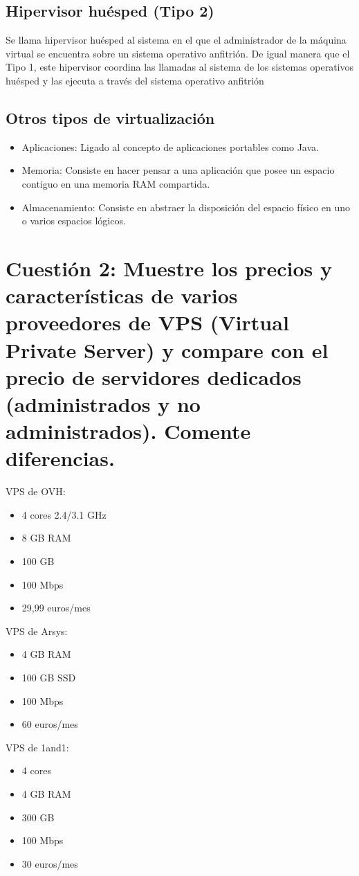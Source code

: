 \subsection{Hipervisor huésped (Tipo 2)}
Se llama hipervisor huésped al sistema en el que el administrador de la máquina virtual se encuentra sobre un sistema operativo anfitrión. De igual manera que el Tipo 1, este hipervisor coordina las llamadas al sistema de los sistemas operativos huésped y las ejecuta a través del sistema operativo anfitrión \cite{hh}

\subsection{Otros tipos de virtualización}
\begin{itemize}
\item Aplicaciones:
Ligado al concepto de aplicaciones portables como Java.
\item Memoria:
Consiste en hacer pensar a una aplicación que posee un espacio contiguo en una memoria RAM compartida.
\item Almacenamiento:
Consiste en abstraer la disposición del espacio físico en uno o varios espacios lógicos.
\end{itemize}


\section{Cuestión 2: Muestre los precios y características de varios proveedores de VPS (Virtual Private Server) y compare con el precio de servidores dedicados (administrados y no administrados). Comente diferencias.}
VPS de OVH: \cite{3}
\begin{itemize}
\item 4 cores 2.4/3.1 GHz
\item 8 GB RAM
\item 100 GB
\item 100 Mbps
\item 29,99 euros/mes
\end{itemize}

VPS de Arsys: \cite{4}
\begin{itemize}
\item 4 GB RAM
\item 100 GB SSD
\item 100 Mbps
\item 60 euros/mes
\end{itemize}

VPS de 1and1: \cite{5}
\begin{itemize}
\item 4 cores
\item 4 GB RAM
\item 300 GB
\item 100 Mbps
\item 30 euros/mes
\end{itemize}

